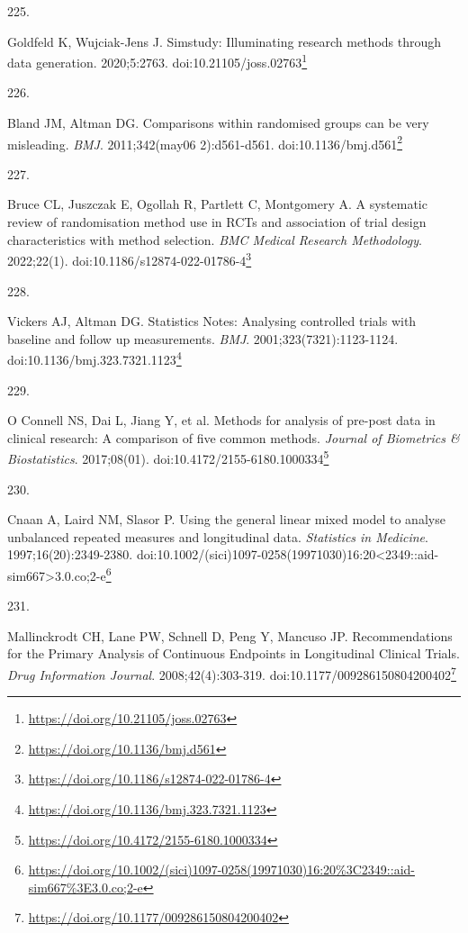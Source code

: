 \documentclass[
  a4paper,
]{book}
\newlength{\cslhangindent}
\newlength{\csllabelwidth}
\newlength{\cslentryspacingunit} %
\newenvironment{CSLReferences}[2] %
 {%
  \setlength{\parindent}{0pt}
  \ifodd #1
  \let\oldpar\par
  \def\par{\hangindent=\cslhangindent\oldpar}
  \fi
  \setlength{\parskip}{#2\cslentryspacingunit}
 }%
 {}
\newcommand{\CSLLeftMargin}[1]{\parbox[t]{\csllabelwidth}{#1}}
\newcommand{\CSLRightInline}[1]{\parbox[t]{\linewidth - \csllabelwidth}{#1}\break}
\renewcommand{\href}[2]{#2\footnote{\url{#1}}}
\begin{document}
\begin{CSLReferences}{0}{0}
\leavevmode{}%
\CSLLeftMargin{225. }%
\CSLRightInline{Goldfeld K, Wujciak-Jens J. Simstudy: Illuminating research methods through data generation. 2020;5:2763. doi:\href{https://doi.org/10.21105/joss.02763}{10.21105/joss.02763}}

\leavevmode{}%
\CSLLeftMargin{226. }%
\CSLRightInline{Bland JM, Altman DG. Comparisons within randomised groups can be very misleading. \emph{BMJ}. 2011;342(may06 2):d561-d561. doi:\href{https://doi.org/10.1136/bmj.d561}{10.1136/bmj.d561}}

\leavevmode{}%
\CSLLeftMargin{227. }%
\CSLRightInline{Bruce CL, Juszczak E, Ogollah R, Partlett C, Montgomery A. A systematic review of randomisation method use in RCTs and association of trial design characteristics with method selection. \emph{BMC Medical Research Methodology}. 2022;22(1). doi:\href{https://doi.org/10.1186/s12874-022-01786-4}{10.1186/s12874-022-01786-4}}

\leavevmode{}%
\CSLLeftMargin{228. }%
\CSLRightInline{Vickers AJ, Altman DG. Statistics Notes: Analysing controlled trials with baseline and follow up measurements. \emph{BMJ}. 2001;323(7321):1123-1124. doi:\href{https://doi.org/10.1136/bmj.323.7321.1123}{10.1136/bmj.323.7321.1123}}

\leavevmode{}%
\CSLLeftMargin{229. }%
\CSLRightInline{O Connell NS, Dai L, Jiang Y, et al. Methods for analysis of pre-post data in clinical research: A comparison of five common methods. \emph{Journal of Biometrics \& Biostatistics}. 2017;08(01). doi:\href{https://doi.org/10.4172/2155-6180.1000334}{10.4172/2155-6180.1000334}}

\leavevmode{}%
\CSLLeftMargin{230. }%
\CSLRightInline{Cnaan A, Laird NM, Slasor P. Using the general linear mixed model to analyse unbalanced repeated measures and longitudinal data. \emph{Statistics in Medicine}. 1997;16(20):2349-2380. doi:\href{https://doi.org/10.1002/(sici)1097-0258(19971030)16:20\%3C2349::aid-sim667\%3E3.0.co;2-e}{10.1002/(sici)1097-0258(19971030)16:20\textless2349::aid-sim667\textgreater3.0.co;2-e}}

\leavevmode{}%
\CSLLeftMargin{231. }%
\CSLRightInline{Mallinckrodt CH, Lane PW, Schnell D, Peng Y, Mancuso JP. Recommendations for the Primary Analysis of Continuous Endpoints in Longitudinal Clinical Trials. \emph{Drug Information Journal}. 2008;42(4):303-319. doi:\href{https://doi.org/10.1177/009286150804200402}{10.1177/009286150804200402}}


\end{CSLReferences}
\end{document}
